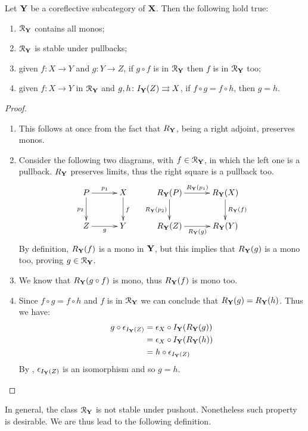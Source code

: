 \documentclass[a4paper,UKenglish,cleveref,pdftex,thm-restate,numberwithinsect]{lipics-v2021}
\def\X{\textbf {\textup{X}}}
\def\Y{\textbf {\textup{Y}}}
\def\Z{\textbf {\textup{Z}}}
\begin{document}
\begin{proposition}\label{prop:varie}
	Let $\Y$ be a coreflective subcategory of $\X$. Then the following hold true:
	\begin{enumerate}
		\item $\mathcal{R}_\Y$ contains all monos;
		\item $\mathcal{R}_\Y$ is stable under pullbacks;
		\item given $f\colon X\to Y$ and $g\colon Y\to Z$, if $g\circ f$ is in $\mathcal{R}_\Y$ then $f$ is in $\mathcal{R}_\Y$ too;
		\item given $f\colon X\to Y$ in $\mathcal{R}_\Y$ and $g,h\colon I_\Y(Z)\rightrightarrows X$, if $f\circ g = f\circ h$, then $g=h$.
	\end{enumerate}
\end{proposition}
\begin{proof}\begin{enumerate}
		\item This follows at once from the fact that $R_\Y$, being a right adjoint, preserves monos.
		\item Consider the following two diagrams, with $f\in \mathcal{R}_\Y$, in which the left one is a pullback. $R_\Y$ preserves limits, thus the right square is a pullback too.
		\[\xymatrix@C=30pt{P \ar[r]^{p_1} \ar[d]_{p_2}& X \ar[d]^{f} & R_\Y(P) \ar[r]^{R_\Y(p_1)} \ar[d]_{R_\Y(p_2)} & R_\Y(X) \ar[d]^{R_\Y(f)}\\Z \ar[r]_{g}& Y & R_\Y(Z) \ar[r]_{R_\Y(g)} & R_\Y(Y)}\]
		By definition, $R_\Y(f)$ is a mono in $\Y$, but this implies that $R_\Y(g)$ is a mono too, proving $g\in \mathcal{R}_\Y$.
		\item We know that $R_\Y(g\circ f)$ is mono, thus $R_\Y(f)$ is mono too.
		\item 	Since $f\circ g=f\circ h$ and $f$ is in $\mathcal{R}_\Y$ we can conclude that $R_\Y(g)=R_\Y(h)$. Thus we have:
		\begin{align*}
			g\circ \epsilon_{I_\Y(Z)}&=\epsilon_X\circ I_\Y(R_\Y(g))\\&=\epsilon_X\circ I_\Y(R_\Y(h))\\&=h\circ \epsilon_{I_\Y(Z)}
		\end{align*}
		By ,  $\epsilon_{I_\Y(Z)}$ is an isomorphism and so $g=h$. \qedhere
	\end{enumerate}
\end{proof}

In general, the class $\mathcal{R}_{\Y}$ is not stable under pushout. Nonetheless such property is desirable. We are thus lead to the following definition.
\end{document}
